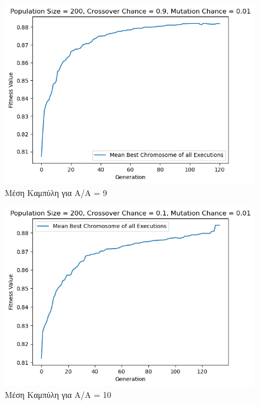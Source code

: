 \documentclass[12pt,a4paper]{article}
\begin{document}
\begin{figure}[H]
	\includegraphics[width=\textwidth]{Figures/17. Means for AA = 9.png}
	\caption{Μέση Καμπύλη για A/A = 9}
\end{figure}

\begin{figure}[H]
	\includegraphics[width=\textwidth]{Figures/19. Means for AA = 10.png}
	\caption{Μέση Καμπύλη για A/A = 10}
\end{figure}
\end{document}
